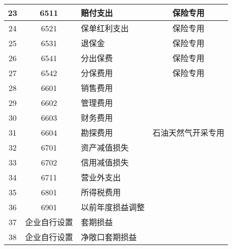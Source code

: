 \documentclass[a4paper]{ctexart}    %
\begin{document}
\begin{center}
\begin{longtable}{|c|c|p{6cm}|c|}
23 & 6511 & 赔付支出 & 保险专用 \\\hline
24 & 6521 & 保单红利支出 & 保险专用 \\\hline
25 & 6531 & 退保金 & 保险专用 \\\hline
26 & 6541 & 分出保费 & 保险专用 \\\hline
27 & 6542 & 分保费用 & 保险专用 \\\hline
28 & 6601 & 销售费用 & \\\hline
29 & 6602 & 管理费用 & \\\hline
30 & 6603 & 财务费用 & \\\hline
31 & 6604 & 勘探费用 & 石油天然气开采专用 \\\hline
32 & 6701 & 资产减值损失 & \\\hline
33 & 6702 & 信用减值损失 & \\\hline
34 & 6711 & 营业外支出 & \\\hline
35 & 6801 & 所得税费用 & \\\hline
36 & 6901 & 以前年度损益调整 & \\\hline
37 & 企业自行设置 & 套期损益 & \\\hline
38 & 企业自行设置 & 净敞口套期损益 & \\\hline
\end{longtable}
\end{center}
\end{document}
